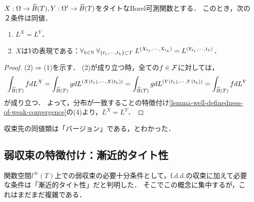 \documentclass[uplatex,dvipdfmx]{jsreport}
\begin{document}
\begin{lemma}[有限な周辺分布への注目]\label{lemma-equalness-of-distribution-in-terms-of-finite-marginal-distribution}
    $X:\Omega\to\widetilde{B}(T),Y:\Omega'\to\widetilde{B}(T)$をタイトなBorel可測関数とする．
    このとき，次の２条件は同値．
    \begin{enumerate}
        \item $L^X=L^Y$．
        \item $X$は$Y$の表現である：$\forall_{k\in\mathbb{N}}\;\forall_{\{t_1,\cdots,t_k\}\subset T}\;L^{(X_{t_1},\cdots,X_{t_k})}=L^{(Y_{t_1},\cdots,t_k)}$．
    \end{enumerate}
\end{lemma}
\begin{proof}
    (2)$\Rightarrow$(1)を示す．
    (2)が成り立つ時，全ての$f\in\mathcal{F}$に対しては，
    \[\int_{\widetilde{B}(T)}fdL^X=\int_{\widetilde{B}(T)}gdL^{(X(t_1),\cdots,X(t_k))}=\int_{\widetilde{B}(T)}gdL^{(Y(t_1),\cdots,Y(t_k))}=\int_{\widetilde{B}(T)}fdL^Y\]
    が成り立つ．
    よって，分布が一致することの特徴付け\ref{lemma-well-definedness-of-weak-convergence}の(4)より，$L^X=L^Y$．
\end{proof}
\begin{remarks}
    収束先の同値類は「バージョン」である，とわかった．
\end{remarks}

\subsection{弱収束の特徴付け：漸近的タイト性}

\begin{tcolorbox}[colframe=ForestGreen, colback=ForestGreen!10!white,breakable,colbacktitle=ForestGreen!40!white,coltitle=black,fonttitle=\bfseries\sffamily,
title=]
    関数空間$l^\infty(T)$上での弱収束の必要十分条件として，f.d.d.の収束に加えて必要な条件は「漸近的タイト性」だと判明した．
    そこでこの概念に集中するが，これはまだまだ複雑である．
\end{tcolorbox}
\end{document}
